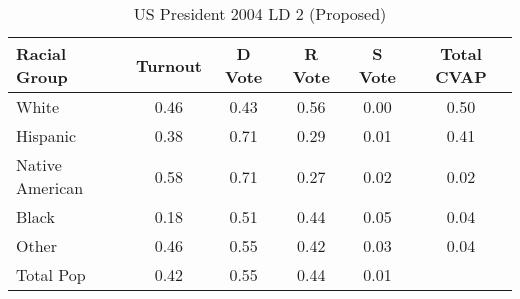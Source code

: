 \begin{table}[htb]
\begin{center}
\caption{US President 2004 LD 2 (Proposed)}
\label{pres04_cvap_ld_2}
\begin{tabular}{lccccc}
  \hline
Racial Group & Turnout & D Vote & R Vote & S Vote & Total CVAP \\ 
  \hline
White & 0.46 & 0.43 & 0.56 & 0.00 & 0.50 \\ 
  Hispanic & 0.38 & 0.71 & 0.29 & 0.01 & 0.41 \\ 
  Native American & 0.58 & 0.71 & 0.27 & 0.02 & 0.02 \\ 
  Black & 0.18 & 0.51 & 0.44 & 0.05 & 0.04 \\ 
  Other & 0.46 & 0.55 & 0.42 & 0.03 & 0.04 \\ 
  Total Pop & 0.42 & 0.55 & 0.44 & 0.01 &  \\ 
   \hline
\end{tabular}
\end{center}
\end{table}
